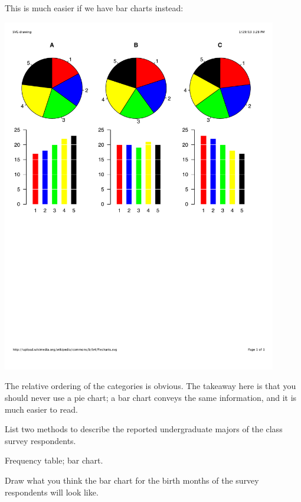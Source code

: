 \documentclass[answers,11pt]{exam}
\begin{document}
\begin{questions}
{\begin{solution}
This is much easier if we have bar charts instead:
\begin{center}
\includegraphics[width=0.9\textwidth]{piecharts-bars}
\end{center}
The relative ordering of the categories is obvious.  The takeaway here is that
you should never use a pie chart; a bar chart conveys the same information,
and it is much easier to read.
\end{solution}



\question List two methods to describe the reported undergraduate majors of
the class survey respondents.

\begin{solution}
Frequency table; bar chart.
\end{solution}


\question Draw what you think the bar chart for the birth months of the survey
respondents will look like.

\begin{solution}
\end{solution}


}
\end{questions}
\end{document}
